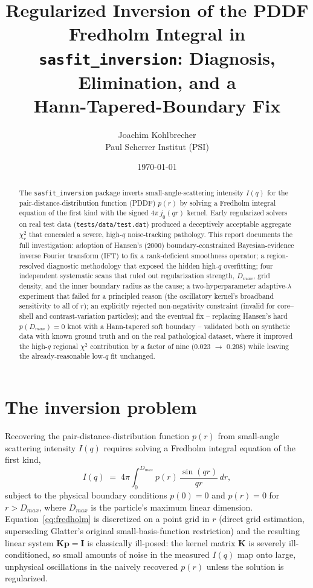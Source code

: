 \documentclass[11pt,a4paper]{article}
\title{\textbf{Regularized Inversion of the PDDF Fredholm Integral in\\
\texttt{sasfit\_inversion}: Diagnosis, Elimination, and a\\
Hann-Tapered-Boundary Fix}}
\author{Joachim Kohlbrecher \\ \small Paul Scherrer Institut (PSI)}
\date{\today}
\begin{document}
\maketitle

\begin{abstract}
\noindent
The \texttt{sasfit\_inversion} package inverts small-angle-scattering
intensity $I(q)$ for the pair-distance-distribution function (PDDF)
$p(r)$ by solving a Fredholm integral equation of the first kind with
the signed $4\pi\, j_0(qr)$ kernel. Early regularized solvers on real
test data (\texttt{tests/data/test.dat}) produced a deceptively
acceptable aggregate $\chi^2_r$ that concealed a severe, high-$q$
noise-tracking pathology. This report documents the full
investigation: adoption of Hansen's (2000) boundary-constrained
Bayesian-evidence inverse Fourier transform (IFT) to fix a
rank-deficient smoothness operator; a region-resolved diagnostic
methodology that exposed the hidden high-$q$ overfitting; four
independent systematic scans that ruled out regularization strength,
$D_{max}$, grid density, and the inner boundary radius as the cause;
a two-hyperparameter adaptive-$\lambda$ experiment that failed for a
principled reason (the oscillatory kernel's broadband sensitivity to
all of $r$); an explicitly rejected non-negativity constraint (invalid
for core--shell and contrast-variation particles); and the eventual
fix -- replacing Hansen's hard $p(D_{max})=0$ knot with a
Hann-tapered soft boundary -- validated both on synthetic data with
known ground truth and on the real pathological dataset, where it
improved the high-$q$ regional $\chi^2$ contribution by a factor of
nine (0.023 $\to$ 0.208) while leaving the already-reasonable
low-$q$ fit unchanged.
\end{abstract}

\tableofcontents

\section{The inversion problem}

Recovering the pair-distance-distribution function $p(r)$ from
small-angle scattering intensity $I(q)$ requires solving a Fredholm
integral equation of the first kind,
\begin{equation}
  I(q) \;=\; 4\pi \int_0^{D_{max}} p(r)\, \frac{\sin(qr)}{qr}\, dr ,
  \label{eq:fredholm}
\end{equation}
subject to the physical boundary conditions $p(0) = 0$ and $p(r) = 0$
for $r > D_{max}$, where $D_{max}$ is the particle's maximum linear
dimension. Equation~\eqref{eq:fredholm} is discretized on a point grid
in $r$ (direct grid estimation, superseding Glatter's original
small-basis-function restriction) and the resulting linear system
$\mathbf{K}\mathbf{p} = \mathbf{I}$ is classically ill-posed: the
kernel matrix $\mathbf{K}$ is severely ill-conditioned, so small
amounts of noise in the measured $I(q)$ map onto large, unphysical
oscillations in the naively recovered $p(r)$ unless the solution is
regularized.
\end{document}
